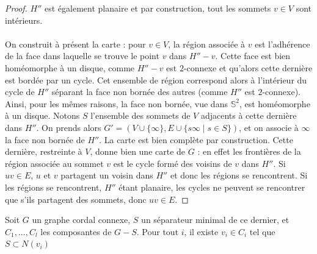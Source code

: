 \documentclass{scrartcl}
\begin{document}
\begin{flushleft}
\begin{proof}
    $H''$ est également planaire et par construction, tout les sommets $v \in V$ sont intérieurs.
    \\~\\
    On construit à présent la carte : pour $v \in V$, la région associée à $v$ est l'adhérence de la face dans laquelle se trouve
    le point $v$ dans $H'' - v$. Cette face est bien homéomorphe à un disque, comme $H'' - v$ est $2$-connexe et qu'alors
    cette dernière est bordée par un cycle. Cet ensemble de région correspond alors à l'intérieur du cycle de $H''$
    séparant la face non bornée des autres (comme $H''$ est $2$-connexe). Ainsi, pour les mêmes raisons, la face non bornée, vue dans $\mathbb{S}^2$,
    est homéomorphe à un disque. Notons $S$ l'ensemble des sommets de $V$ adjacents à cette dernière dans $H''$.
    On prends alors $G' = (V \cup \{\infty\}, E \cup \{s\infty \mid s \in S \} )$, et on associe à $\infty$ la face non bornée de $H''$.
    La carte est bien complète par construction. Cette dernière, restreinte à $V$, donne bien une carte de $G$ : en effet les frontières
    de la région associée au sommet $v$ est le cycle formé des voisins de $v$ dans $H''$. Si $uv \in E$, $u$ et $v$ partagent un voisin
    dans $H''$ et donc les régions se rencontrent. Si les régions se rencontrent, $H''$ étant planaire, les cycles ne peuvent se rencontrer
    que s'ils partagent des sommets, donc $uv \in E$.
\end{proof}

\begin{lem*}[\ref{cordsepintercliquemax}]
    Soit $G$ un graphe cordal connexe, $S$ un séparateur minimal de ce dernier, et $C_1, ..., C_l$ les composantes de $G - S$. Pour tout
    $i$, il existe $v_i \in C_i$ tel que $S \subset N(v_i)$
\end{lem*}


\end{flushleft}
\end{document}
